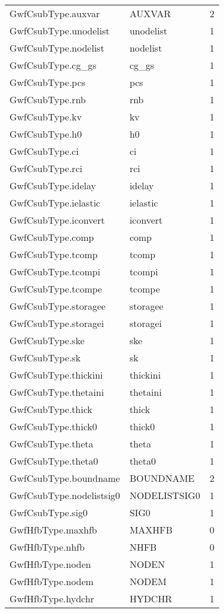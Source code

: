 \begin{longtable}{p{6cm} p{4cm} p{2cm} }
GwfCsubType.auxvar &  AUXVAR & 2 \\ 
GwfCsubType.unodelist &  unodelist & 1 \\ 
GwfCsubType.nodelist &  nodelist & 1 \\ 
GwfCsubType.cg\_gs &  cg\_gs & 1 \\ 
GwfCsubType.pcs &  pcs & 1 \\ 
GwfCsubType.rnb &  rnb & 1 \\ 
GwfCsubType.kv &  kv & 1 \\ 
GwfCsubType.h0 &  h0 & 1 \\ 
GwfCsubType.ci &  ci & 1 \\ 
GwfCsubType.rci &  rci & 1 \\ 
GwfCsubType.idelay &  idelay & 1 \\ 
GwfCsubType.ielastic &  ielastic & 1 \\ 
GwfCsubType.iconvert &  iconvert & 1 \\ 
GwfCsubType.comp &  comp & 1 \\ 
GwfCsubType.tcomp &  tcomp & 1 \\ 
GwfCsubType.tcompi &  tcompi & 1 \\ 
GwfCsubType.tcompe &  tcompe & 1 \\ 
GwfCsubType.storagee &  storagee & 1 \\ 
GwfCsubType.storagei &  storagei & 1 \\ 
GwfCsubType.ske &  ske & 1 \\ 
GwfCsubType.sk &  sk & 1 \\ 
GwfCsubType.thickini &  thickini & 1 \\ 
GwfCsubType.thetaini &  thetaini & 1 \\ 
GwfCsubType.thick &  thick & 1 \\ 
GwfCsubType.thick0 &  thick0 & 1 \\ 
GwfCsubType.theta &  theta & 1 \\ 
GwfCsubType.theta0 &  theta0 & 1 \\ 
GwfCsubType.boundname & BOUNDNAME & 2 \\ 
GwfCsubType.nodelistsig0 &  NODELISTSIG0 & 1 \\ 
GwfCsubType.sig0 &  SIG0 & 1 \\ 
GwfHfbType.maxhfb &  MAXHFB & 0 \\ 
GwfHfbType.nhfb &  NHFB & 0 \\ 
GwfHfbType.noden &  NODEN & 1 \\ 
GwfHfbType.nodem &  NODEM & 1 \\ 
GwfHfbType.hydchr &  HYDCHR & 1 \\ 

\end{longtable}
